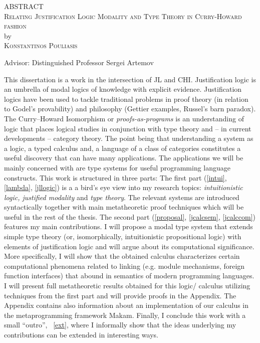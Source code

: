 \documentclass[letterpaper, 12pt, oneside]{book}
\begin{document}

\begin{center}
    ABSTRACT \\
    \textsc{Relating Justification Logic Modality and Type Theory in Curry-Howard fashion} \\
    by \\
    \textsc{Konstantinos Pouliasis} \\[0.15in]
    \end{center}
    
    \vspace{0.20in}
    
    \noindent Advisor: Distinguished Professor Sergei Artemov
    
    \vspace{0.20in}
    
    \noindent This dissertation is a work in the intersection of \ac{JL} and \ac{CHI}. Justification logic is an umbrella of modal logics of knowledge with explicit evidence. 
    Justification logics have been used to tackle traditional problems in proof theory (in relation to Godel's provability) and philosophy (Gettier examples, Russel's barn paradox). 
    The Curry--Howard Isomorphism or \emph{proofs-as-programs} is an understanding of logic that places logical studies in conjunction with type theory and -- in current developments -- 
    category theory. The point being that  understanding a system as a logic, a typed calculus and,  a language of a class of categories constitutes a useful discovery 
    that can have many applications.
    The applications  we will be mainly concerned with  are type systems 
    for useful programming language constructs. 
    This work  is structured in three parts: 
    The first part (\cref{intui}, \cref{lambda}, \cref{jllogic}) is a  
    a bird's eye view into my 
    research topics:  
    \emph{intuitionistic logic, justified modality} and \emph{type theory}. 
    The relevant systems are introduced syntactically together with main 
     metatheoretic proof techniques which will be useful 
    in the rest of the thesis.
    The second part (\cref{proposal}, \cref{jcalcsem}, \cref{jcalccom}) 
    features my main contributions.
    I will propose  
    a modal type system that extends simple type theory
     (or, isomorphically, intuitionistic propositional logic) with elements of
     justification logic and will argue about its computational significance. 
     More specifically, I will show  
    that the obtained calculus characterizes  certain 
    computational phenomena related to linking (e.g. module mechanisms, foreign function interfaces) 
    that abound in semantics of modern programming languages. 
    I will present full metatheoretic
    results obtained for this logic/ calculus utilizing techniques from the first part 
    and will provide proofs in the Appendix. The Appendix contains also information about
    an implementation of our calculus in the metaprogramming framework {\sf Makam}.
    Finally, I conclude this work with a small ``outro'', ~\cref{ext},
    where I informally show that the ideas underlying my contributions 
    can be extended in interesting ways.
    
\end{document}
